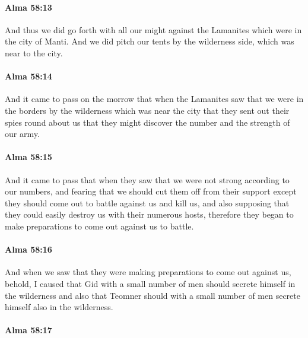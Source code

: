 		\paragraph{Alma 58:13} %
			\label{ALMA-58-13}

			And thus we did go forth with all our might against the Lamanites
			which were in the city of Manti.
			And we did pitch our tents by the wilderness side, which was near to the city.

		\paragraph{Alma 58:14} %
			\label{ALMA-58-14}

			And it came to pass on the morrow
			that when the Lamanites saw that we were in the borders
			by the wilderness which was near the city
			that they sent out their spies round about us
			that they might discover the number and the strength of our army.

		\paragraph{Alma 58:15} %
			\label{ALMA-58-15}

			And it came to pass that when they saw
			that we were not strong according to our numbers,
			and fearing that we should cut them off from their support
			except they should come out to battle against us and kill us,
			and also supposing that they could easily destroy us with their numerous hosts,
			therefore they began to make preparations to come out against us to battle.

		\paragraph{Alma 58:16} %
			\label{ALMA-58-16}

			And when we saw that they were making preparations to come out against us,
			behold, I caused that Gid with a small number of men
			should secrete himself in the wilderness
			and also that Teomner should with a small number of men
			secrete himself also in the wilderness.

		\paragraph{Alma 58:17} %
			\label{ALMA-58-17}


